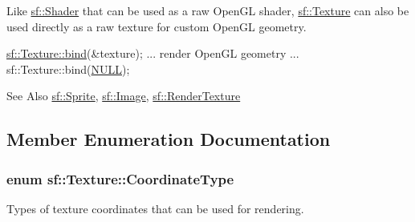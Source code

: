 Like \hyperlink{classsf_1_1_shader}{sf\-::\-Shader} that can be used as a raw Open\-G\-L shader, \hyperlink{classsf_1_1_texture}{sf\-::\-Texture} can also be used directly as a raw texture for custom Open\-G\-L geometry. 
\begin{DoxyCode}
\hyperlink{classsf_1_1_texture_ae9a4274e7b95ebf7244d09c7445833b0}{sf::Texture::bind}(&texture);
... render OpenGL geometry ...
sf::Texture::bind(\hyperlink{internal_8h_a070d2ce7b6bb7e5c05602aa8c308d0c4}{NULL});
\end{DoxyCode}


\begin{DoxySeeAlso}{See Also}
\hyperlink{classsf_1_1_sprite}{sf\-::\-Sprite}, \hyperlink{classsf_1_1_image}{sf\-::\-Image}, \hyperlink{classsf_1_1_render_texture}{sf\-::\-Render\-Texture} 
\end{DoxySeeAlso}


\subsection{Member Enumeration Documentation}
\hypertarget{classsf_1_1_texture_aa6fd3bbe3c334b3c4428edfb2765a82e}{
\subsubsection[{Coordinate\-Type}]{\setlength{\rightskip}{0pt plus 5cm}enum {\bf sf\-::\-Texture\-::\-Coordinate\-Type}}}\label{classsf_1_1_texture_aa6fd3bbe3c334b3c4428edfb2765a82e}


Types of texture coordinates that can be used for rendering. 

